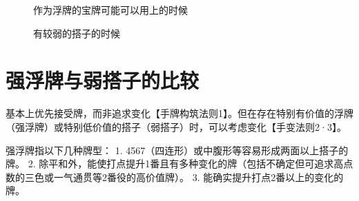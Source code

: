 \begin{figure}[h]
    \caption{作为浮牌的宝牌可能可以用上的时候}
    \label{lec8:pai6}
\end{figure}

\begin{figure}[h]
    \caption{有较弱的搭子的时候}
    \label{lec8:pai7-10}
    \par\bigskip
    \par\bigskip
    \par\bigskip
    \par\bigskip
\end{figure}

\section{强浮牌与弱搭子的比较}

基本上优先接受牌，而非追求变化【手牌构筑法则1】。但在存在特别有价值的浮牌（强浮牌）或特别低价值的搭子（弱搭子）时，可以考虑变化【手变法则2·3】。

强浮牌指以下几种牌型：
1. 4567（四连形）或中腹形等容易形成两面以上搭子的牌。
2. 除平和外，能使打点提升1番且有多种变化的牌（包括不确定但可追求高点数的三色或一气通贯等2番役的高价值牌）。
3. 能确实提升打点2番以上的变化的牌。
